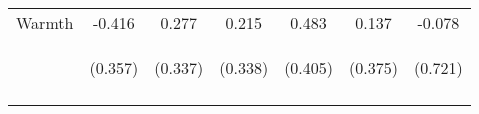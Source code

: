 \begin{tabular}{lcccccc}
\noalign{\smallskip}Warmth & -0.416 & 0.277 & 0.215 & 0.483 & 0.137 & -0.078\\
 & \begin{footnotesize}(0.357)\end{footnotesize} & \begin{footnotesize}(0.337)\end{footnotesize} & \begin{footnotesize}(0.338)\end{footnotesize} & \begin{footnotesize}(0.405)\end{footnotesize} & \begin{footnotesize}(0.375)\end{footnotesize} & \begin{footnotesize}(0.721)\end{footnotesize}\\
\noalign{\smallskip}\hline\end{tabular}\\
